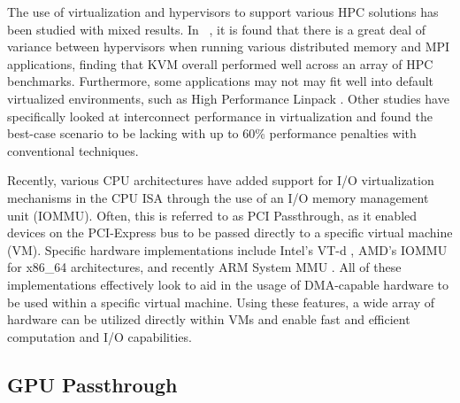 \documentclass[10pt]{sigplanconf}
\begin{document}
The use of virtualization and hypervisors to support various HPC solutions has been studied with mixed results.  In ~\cite{Younge2011cloud}, it is found that there is a great deal of variance between hypervisors when running various distributed memory and MPI applications, finding that KVM overall performed well across an array of HPC benchmarks.  Furthermore, some applications may not may fit well into default virtualized environments, such as High Performance Linpack \cite{Luszczek:2011:EHC}. Other studies have specifically looked at interconnect performance in virtualization and found the best-case scenario to be lacking \cite{Ramakrishnan2012} with up to 60\% performance penalties with conventional techniques.
 
Recently, various CPU architectures have added support for I/O virtualization mechanisms in the CPU ISA through the use of an I/O memory management unit (IOMMU). Often, this is referred to as PCI Passthrough, as it enabled devices on the PCI-Express bus to be passed directly to a specific virtual machine (VM).  Specific hardware implementations include Intel's VT-d \cite{intelvirtualization}, AMD's IOMMU \cite{amdiommu} for x86\_64 architectures, and recently ARM System MMU \cite{armmmu}.  All of these implementations effectively look to aid in the usage of DMA-capable hardware to be used within a specific virtual machine. Using these features, a wide array of hardware can be utilized directly within VMs and enable fast and efficient computation and I/O capabilities.



\subsection{GPU Passthrough}
\end{document}
